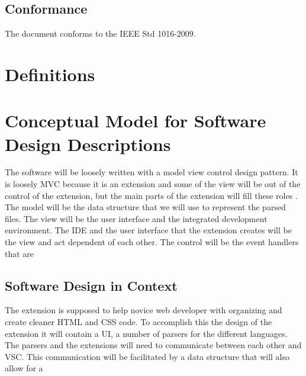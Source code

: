 \documentclass[letterpaper,10pt,titlepage,draftclsnofoot,onecolumn,onesided] {IEEEtran}
\begin{document}
\subsection{Conformance}
The document conforms to the IEEE Std 1016-2009.

\section{Definitions}
\newtheorem{VSC}{An acronym of Visual Studio Code. Visaul Studio Code is the IDE for which the postal extension is being built.}
\newtheorem{IDE}{An acronym of Integrated Development Environment.}
\newtheorem{UI}{An acronym of User Interface}
\newtheorem{MVC}{Model-View-Controller (MVC) design pattern assigns objects in an application one of three roles: model, view, or controller. The pattern defines not only the roles objects play in the application, it defines the way objects communicate with each other. Each of the three types of objects is separated from the others by abstract boundaries and communicates with objects of the other types across those boundaries. The collection of objects of a certain MVC type in an application is sometimes referred to as a layer—for example, model layer.\cite{appleMVC}}

\section{Conceptual Model for Software Design Descriptions}
The software will be loosely written with a model view control design pattern.
It is loosely MVC because it is an extension and some of the view will be out of the control of the extension, but the main parts of the extension will fill these roles .
The model will be the data structure that we will use to represent the parsed files. 
The view will be the user interface and the integrated development environment.
The IDE and the user interface that the extension creates will be the view and act dependent of each other.
The control will be the event handlers that are 

\subsection{Software Design in Context}
The extension is supposed to help novice web developer with organizing and create cleaner HTML and CSS code. 
To accomplish this the design of the extension it will contain a UI, a number of parsers for the different languages.
The parsers and the extensions will need to communicate between each other and VSC.
This communication will be facilitated by a data structure that will also allow for a 
\end{document}

